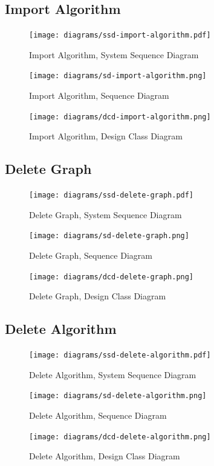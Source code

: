 \subsection{Import Algorithm}
\begin{figure}[H]
    \texttt{[image: diagrams/ssd-import-algorithm.pdf]}
    \caption{Import Algorithm, System Sequence Diagram}
    \label{fig:import-algorithm-ssd}
\end{figure}
\begin{figure}[H]
    \texttt{[image: diagrams/sd-import-algorithm.png]}
    \caption{Import Algorithm, Sequence Diagram}
    \label{fig:import-algorithm-sd}
\end{figure}
\begin{figure}[H]
    \texttt{[image: diagrams/dcd-import-algorithm.png]}
    \caption{Import Algorithm, Design Class Diagram}
    \label{fig:import-algorithm-dcd}
\end{figure}
\newpage
% 
\subsection{Delete Graph}
\begin{figure}[H]
    \texttt{[image: diagrams/ssd-delete-graph.pdf]}
    \caption{Delete Graph, System Sequence Diagram}
    \label{fig:delete-graph-ssd}
\end{figure}
\begin{figure}[H]
    \texttt{[image: diagrams/sd-delete-graph.png]}
    \caption{Delete Graph, Sequence Diagram}
    \label{fig:delete-graph-sd}
\end{figure}
\begin{figure}[H]
    \texttt{[image: diagrams/dcd-delete-graph.png]}
    \caption{Delete Graph, Design Class Diagram}
    \label{fig:delete-graph-dcd}
\end{figure}
\newpage
% 
\subsection{Delete Algorithm}
\begin{figure}[H]
    \texttt{[image: diagrams/ssd-delete-algorithm.pdf]}
    \caption{Delete Algorithm, System Sequence Diagram}
    \label{fig:delete-algorithm-ssd}
\end{figure}
\begin{figure}[H]
    \texttt{[image: diagrams/sd-delete-algorithm.png]}
    \caption{Delete Algorithm, Sequence Diagram}
    \label{fig:delete-algorithm-sd}
\end{figure}
\begin{figure}[H]
    \texttt{[image: diagrams/dcd-delete-algorithm.png]}
    \caption{Delete Algorithm, Design Class Diagram}
    \label{fig:delete-algorithm-dcd}
\end{figure}
\newpage
% 
